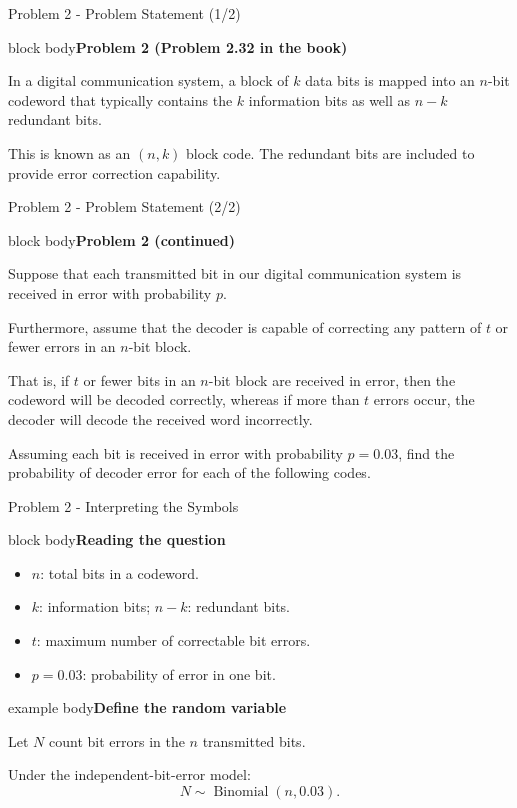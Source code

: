 \documentclass[aspectratio=169,11pt]{beamer}
\newenvironment{answerbox}[1]{\begin{beamercolorbox}[rounded=true,wd=\linewidth,sep=0.75em]{example body}\color{darkText}\textbf{#1}\par\medskip}{\end{beamercolorbox}}
\newenvironment{cleanblock}[1]{\begin{beamercolorbox}[rounded=true,wd=\linewidth,sep=0.75em]{block body}\color{darkText}\textbf{#1}\par\medskip}{\end{beamercolorbox}}
\begin{document}
\begin{frame}{Problem 2 - Problem Statement (1/2)}
\small
\begin{cleanblock}{Problem 2 (Problem 2.32 in the book)}
In a digital communication system, a block of $k$ data bits is mapped into an $n$-bit codeword that typically contains the $k$ information bits as well as $n-k$ redundant bits.

\medskip
This is known as an $(n,k)$ block code. The redundant bits are included to provide error correction capability.
\end{cleanblock}
\end{frame}

\begin{frame}{Problem 2 - Problem Statement (2/2)}
\small
\begin{cleanblock}{Problem 2 (continued)}
Suppose that each transmitted bit in our digital communication system is received in error with probability $p$.

\medskip
Furthermore, assume that the decoder is capable of correcting any pattern of $t$ or fewer errors in an $n$-bit block.

\medskip
That is, if $t$ or fewer bits in an $n$-bit block are received in error, then the codeword will be decoded correctly, whereas if more than $t$ errors occur, the decoder will decode the received word incorrectly.

\medskip
Assuming each bit is received in error with probability $p=0.03$, find the probability of decoder error for each of the following codes.
\end{cleanblock}
\end{frame}

\begin{frame}{Problem 2 - Interpreting the Symbols}
\footnotesize
\begin{cleanblock}{Reading the question}
\begin{itemize}
\item $n$: total bits in a codeword.
\item $k$: information bits; $n-k$: redundant bits.
\item $t$: maximum number of correctable bit errors.
\item $p=0.03$: probability of error in one bit.
\end{itemize}
\end{cleanblock}
\begin{answerbox}{Define the random variable}
Let $N$ count bit errors in the $n$ transmitted bits.

Under the independent-bit-error model:
\[
N\sim\operatorname{Binomial}(n,0.03).
\]
\end{answerbox}
\end{frame}
\end{document}

